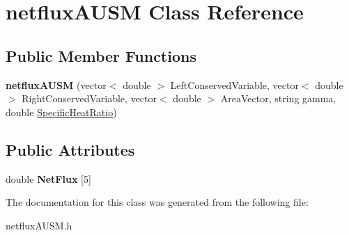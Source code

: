 \hypertarget{classnetfluxAUSM}{}\section{netflux\+A\+U\+SM Class Reference}
\label{classnetfluxAUSM}
\subsection*{Public Member Functions}
\begin{DoxyCompactItemize}
\item 
{\bfseries netflux\+A\+U\+SM} (vector$<$ double $>$ Left\+Conserved\+Variable, vector$<$ double $>$ Right\+Conserved\+Variable, vector$<$ double $>$ Area\+Vector, string gamma, double \hyperlink{interface_8h_ab683b1fef77e9bd4205b818c943fec96}{Specific\+Heat\+Ratio})\hypertarget{classnetfluxAUSM_a68c53463497f0c6b3ba8cfc9af17b5cd}{}\label{classnetfluxAUSM_a68c53463497f0c6b3ba8cfc9af17b5cd}

\end{DoxyCompactItemize}
\subsection*{Public Attributes}
\begin{DoxyCompactItemize}
\item 
double {\bfseries Net\+Flux} \mbox{[}5\mbox{]}\hypertarget{classnetfluxAUSM_a8fb78535709581ad1f781aff25e61ff9}{}\label{classnetfluxAUSM_a8fb78535709581ad1f781aff25e61ff9}

\end{DoxyCompactItemize}


The documentation for this class was generated from the following file\+:\begin{DoxyCompactItemize}
\item 
netflux\+A\+U\+S\+M.\+h\end{DoxyCompactItemize}
